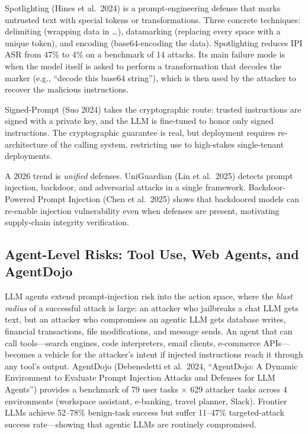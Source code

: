 Spotlighting (Hines et al.~2024) is a prompt-engineering defense that marks untrusted text with special tokens or transformations. Three concrete techniques: delimiting (wrapping data in \ldots{}), datamarking (replacing every space with a unique token), and encoding (base64-encoding the data). Spotlighting reduces IPI ASR from 47\% to 4\% on a benchmark of 14 attacks. Its main failure mode is when the model itself is asked to perform a transformation that decodes the marker (e.g., ``decode this base64 string''), which is then used by the attacker to recover the malicious instructions.

Signed-Prompt (Suo 2024) takes the cryptographic route: trusted instructions are signed with a private key, and the LLM is fine-tuned to honor only signed instructions. The cryptographic guarantee is real, but deployment requires re-architecture of the calling system, restricting use to high-stakes single-tenant deployments.

A 2026 trend is \emph{unified} defenses. UniGuardian (Lin et al.~2025) detects prompt injection, backdoor, and adversarial attacks in a single framework. Backdoor-Powered Prompt Injection (Chen et al.~2025) shows that backdoored models can re-enable injection vulnerability even when defenses are present, motivating supply-chain integrity verification.

\subsection{Agent-Level Risks: Tool Use, Web Agents, and AgentDojo}\label{agent-level-risks-tool-use-web-agents-and-agentdojo}

LLM agents extend prompt-injection risk into the action space, where the \emph{blast radius} of a successful attack is large: an attacker who jailbreaks a chat LLM gets text, but an attacker who compromises an agentic LLM gets database writes, financial transactions, file modifications, and message sends. An agent that can call tools---search engines, code interpreters, email clients, e-commerce APIs---becomes a vehicle for the attacker's intent if injected instructions reach it through any tool's output. AgentDojo (Debenedetti et al.~2024, ``AgentDojo: A Dynamic Environment to Evaluate Prompt Injection Attacks and Defenses for LLM Agents'') provides a benchmark of 79 user tasks × 629 attacker tasks across 4 environments (workspace assistant, e-banking, travel planner, Slack). Frontier LLMs achieve 52--78\% benign-task success but suffer 11--47\% targeted-attack success rate---showing that agentic LLMs are routinely compromised.

